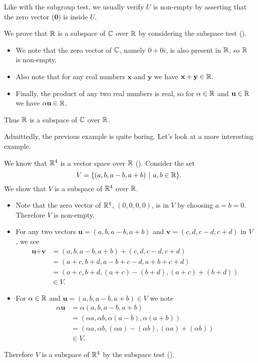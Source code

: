 \begin{remark}
    Like with the subgroup test, we usually verify $U$ is non-empty by asserting that the zero vector ($\textbf{0}$) is inside $U$.
\end{remark}

\begin{example}
    We prove that $\mathbb{R}$ is a subspace of $\mathbb{C}$ over $\mathbb{R}$ by considering the subspace test ().
    \begin{itemize}
        \item We note that the zero vector of $\mathbb{C}$, namely $0 + 0i$, is also present in $\mathbb{R}$, so $\mathbb{R}$ is non-empty.
        \item Also note that for any real numbers $\textbf{x}$ and $\textbf{y}$ we have $\textbf{x} + \textbf{y} \in \mathbb{R}$.
        \item Finally, the product of any two real numbers is real, so for $\alpha \in \mathbb{R}$ and $\textbf{u} \in \mathbb{R}$ we have $\alpha\textbf{u} \in \mathbb{R}$.
    \end{itemize}
    Thus $\mathbb{R}$ is a subspace of $\mathbb{C}$ over $\mathbb{R}$.
\end{example}

Admittedly, the previous example is quite boring. Let's look at a more interesting example.
\begin{example}
    We know that $\mathbb{R}^4$ is a vector space over $\mathbb{R}$ (). Consider the set
    \[
        V = \{(a, b, a-b, a+b) \vert a, b \in \R\}.
    \]
    We show that $V$ is a subspace of $\mathbb{R}^4$ over $\mathbb{R}$.
    \begin{itemize}
        \item Note that the zero vector of $\mathbb{R}^4$, $(0,0,0,0)$, is in $V$ by choosing $a = b = 0$. Therefore $V$ is non-empty.
        \item For any two vectors $\textbf{u} = (a, b, a-b, a+b)$ and $\textbf{v} = (c, d, c-d, c+d)$ in $V$, we see
        \begin{align*}
            \textbf{u} + \textbf{v} &= (a, b, a-b, a+b) + (c, d, c-d, c+d)\\
            &= (a + c, b + d, a - b + c - d, a + b + c + d)\\
            &= (a+c, b+d, (a+c)-(b+d), (a+c)+(b+d))\\
            &\in V.
        \end{align*}
        \item For $\alpha \in \mathbb{R}$ and $\textbf{u} = (a, b, a-b, a+b) \in V$ we note
        \begin{align*}
            \alpha\textbf{u} &= \alpha(a, b, a-b, a+b)\\
            &= (\alpha a, \alpha b, \alpha(a-b), \alpha(a+b))\\
            &= (\alpha a, \alpha b, (\alpha a) - (\alpha b), (\alpha a) + (\alpha b))\\
            &\in V.
        \end{align*}
    \end{itemize}
    Therefore $V$ is a subspace of $\mathbb{R}^4$ by the subspace test ().
\end{example}

